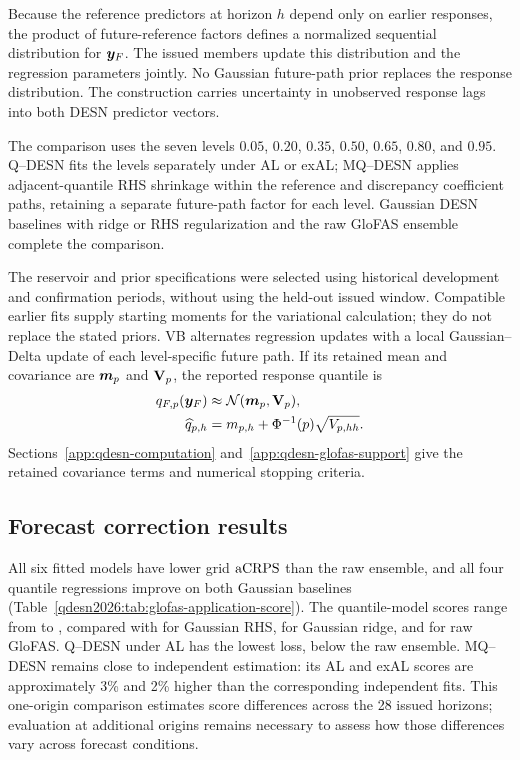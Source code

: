 Because the reference predictors at horizon \(h\) depend only on earlier
responses, the product of future-reference factors defines a normalized
sequential distribution for \(\boldsymbol{y}_F\). The issued members update this
distribution and the regression parameters jointly. No Gaussian
future-path prior replaces the response distribution. The construction carries
uncertainty in unobserved response lags into both DESN predictor vectors.

The comparison uses the seven levels \(0.05\), \(0.20\), \(0.35\), \(0.50\),
\(0.65\), \(0.80\), and \(0.95\). Q--DESN fits the levels separately under
AL or exAL; MQ--DESN applies adjacent-quantile RHS shrinkage within the
reference and discrepancy coefficient paths, retaining a separate future-path
factor for each level. Gaussian DESN baselines with ridge or RHS regularization
and the raw GloFAS ensemble complete the comparison.

The reservoir and prior specifications were selected using historical
development and confirmation periods, without using the held-out issued
window. Compatible earlier fits supply starting moments for the variational
calculation; they do not replace the stated priors. VB alternates regression
updates with a local Gaussian--Delta update of each level-specific future
path. If its retained mean and covariance are \(\boldsymbol{m}_p\) and \(\mathbf{V}_p\),
the reported response quantile is
\begin{equation}
\begin{aligned}
q_{F,p}(\boldsymbol{y}_F)&\approx\mathcal{N}(\boldsymbol{m}_p,\mathbf{V}_p),\\
\widehat q_{p,h}&=m_{p,h}+\Phi^{-1}(p)\sqrt{V_{p,hh}}.
\end{aligned}
\label{qdesn2026:eq:glofas-reference-forecast-main}
\end{equation}
Sections~\ref{app:qdesn-computation} and~\ref{app:qdesn-glofas-support}
give the retained covariance terms and numerical stopping criteria.

\subsection{Forecast correction results}

All six fitted models have lower grid \(\operatorname{aCRPS}\) than the raw ensemble, and
all four quantile regressions improve on both Gaussian baselines
(Table~\ref{qdesn2026:tab:glofas-application-score}). The quantile-model
scores range from \GlofasApplicationCurrentQdesnAcrps{} to
\GlofasApplicationCurrentJointExalAcrps{}, compared with
\GlofasApplicationCurrentNormalRhsAcrps{} for Gaussian RHS,
\GlofasApplicationCurrentNormalRidgeAcrps{} for Gaussian ridge, and
\GlofasApplicationCurrentRawAcrps{} for raw GloFAS. Q--DESN under AL has
the lowest loss, \GlofasApplicationCurrentAcrpsReduction{} below the raw
ensemble. MQ--DESN remains close to independent estimation: its AL and exAL
scores are approximately 3\% and 2\% higher than the corresponding independent
fits. This one-origin comparison estimates score differences across the 28
issued horizons; evaluation at additional origins remains necessary to assess
how those differences vary across forecast conditions.

